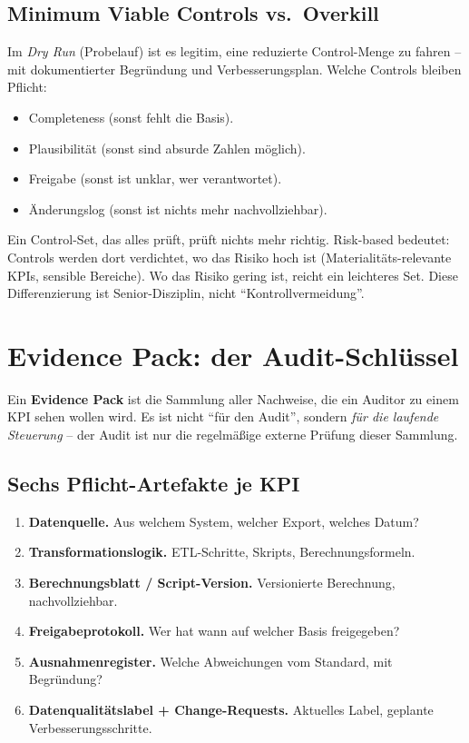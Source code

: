 \documentclass[11pt,a4paper,oneside]{article}
\newcommand{\fachbegriff}[1]{\textbf{#1}}
\begin{document}
\subsection{Minimum Viable Controls vs.\ Overkill}

Im \emph{Dry Run} (Probelauf) ist es legitim, eine reduzierte Control-Menge zu fahren -- mit dokumentierter Begründung und Verbesserungsplan. Welche Controls bleiben Pflicht:

\begin{itemize}
  \item Completeness (sonst fehlt die Basis).
  \item Plausibilität (sonst sind absurde Zahlen möglich).
  \item Freigabe (sonst ist unklar, wer verantwortet).
  \item Änderungslog (sonst ist nichts mehr nachvollziehbar).
\end{itemize}

\begin{merkbox}
Ein Control-Set, das alles prüft, prüft nichts mehr richtig. Risk-based bedeutet: Controls werden dort verdichtet, wo das Risiko hoch ist (Materialitäts-relevante KPIs, sensible Bereiche). Wo das Risiko gering ist, reicht ein leichteres Set. Diese Differenzierung ist Senior-Disziplin, nicht ``Kontrollvermeidung''.
\end{merkbox}

\section{Evidence Pack: der Audit-Schlüssel}

Ein \fachbegriff{Evidence Pack} ist die Sammlung aller Nachweise, die ein Auditor zu einem KPI sehen wollen wird. Es ist nicht ``für den Audit'', sondern \emph{für die laufende Steuerung} -- der Audit ist nur die regelmäßige externe Prüfung dieser Sammlung.

\subsection{Sechs Pflicht-Artefakte je KPI}

\begin{enumerate}
  \item \textbf{Datenquelle.} Aus welchem System, welcher Export, welches Datum?
  \item \textbf{Transformationslogik.} ETL-Schritte, Skripts, Berechnungsformeln.
  \item \textbf{Berechnungsblatt / Script-Version.} Versionierte Berechnung, nachvollziehbar.
  \item \textbf{Freigabeprotokoll.} Wer hat wann auf welcher Basis freigegeben?
  \item \textbf{Ausnahmenregister.} Welche Abweichungen vom Standard, mit Begründung?
  \item \textbf{Datenqualitätslabel + Change-Requests.} Aktuelles Label, geplante Verbesserungsschritte.
\end{enumerate}
\end{document}
